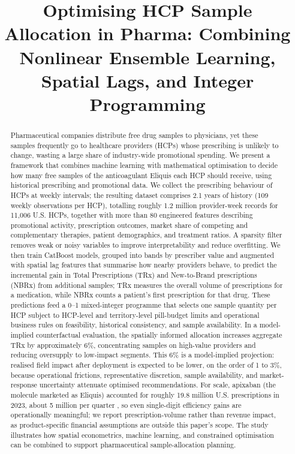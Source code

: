 \title{Optimising HCP Sample Allocation in Pharma: Combining Nonlinear Ensemble Learning, Spatial Lags, and Integer Programming}

\begin{abstract}
Pharmaceutical companies distribute free drug samples to physicians, yet these samples frequently go to healthcare providers (HCPs) whose prescribing is unlikely to change, wasting a large share of industry-wide promotional spending. We present a framework that combines machine learning with mathematical optimisation to decide how many free samples of the anticoagulant Eliquis each HCP should receive, using historical prescribing and promotional data. We collect the prescribing behaviour of HCPs at weekly intervals; the resulting dataset comprises 2.1 years of history (109 weekly observations per HCP), totalling roughly 1.2 million provider-week records for 11,006 U.S. HCPs, together with more than 80 engineered features describing promotional activity, prescription outcomes, market share of competing and complementary therapies, patient demographics, and treatment ratios. A sparsity filter removes weak or noisy variables to improve interpretability and reduce overfitting. We then train CatBoost models, grouped into bands by prescriber value and augmented with spatial lag features that summarise how nearby providers behave, to predict the incremental gain in Total Prescriptions (TRx) and New-to-Brand prescriptions (NBRx) from additional samples; TRx measures the overall volume of prescriptions for a medication, while NBRx counts a patient's first prescription for that drug. These predictions feed a 0--1 mixed-integer programme that selects one sample quantity per HCP subject to HCP-level and territory-level pill-budget limits and operational business rules on feasibility, historical consistency, and sample availability. In a model-implied counterfactual evaluation, the spatially informed allocation increases aggregate TRx by approximately 6\%, concentrating samples on high-value providers and reducing oversupply to low-impact segments. This 6\% is a model-implied projection: realised field impact after deployment is expected to be lower, on the order of 1 to 3\%, because operational frictions, representative discretion, sample availability, and market-response uncertainty attenuate optimised recommendations. For scale, apixaban (the molecule marketed as Eliquis) accounted for roughly 19.8 million U.S. prescriptions in 2023, about 5 million per quarter \citep{ClinCalcApixaban2023}, so even single-digit efficiency gains are operationally meaningful; we report prescription-volume rather than revenue impact, as product-specific financial assumptions are outside this paper's scope. The study illustrates how spatial econometrics, machine learning, and constrained optimisation can be combined to support pharmaceutical sample-allocation planning.
\end{abstract}

